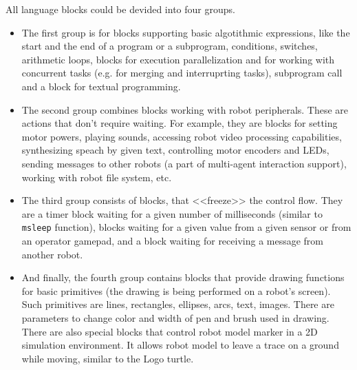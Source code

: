 \documentclass[conference]{IEEEtran}
\begin{document}
All language blocks could be devided into four groups.

\begin{itemize}
    \item The first group is for blocks supporting basic algotithmic expressions, like the start and the end of a program or a subprogram, conditions, switches, arithmetic loops, blocks for execution parallelization and for working with concurrent tasks (e.g. for merging and interruprting tasks), subprogram call and a block for textual programming.
    \item The second group combines blocks working with robot peripherals. These are actions that don't require waiting. For example, they are blocks for setting motor powers, playing sounds, accessing robot video processing capabilities, synthesizing speach by given text, controlling motor encoders and LEDs, sending messages to other robots (a part of multi-agent interaction support), working with robot file system, etc.
    \item The third group consists of blocks, that <<freeze>> the control flow. They are a timer block waiting for a given number of milliseconds (similar to \texttt{msleep} function), blocks waiting for a given value from a given sensor or from an operator gamepad, and a block waiting for receiving a message from another robot. 
    \item And finally, the fourth group contains blocks that provide drawing functions for basic primitives (the drawing is being performed on a robot's screen). Such primitives are lines, rectangles, ellipses, arcs, text, images. There are parameters to change color and width of pen and brush used in drawing. There are also special blocks that control robot model marker in a 2D simulation environment. It allows robot model to leave a trace on a ground while moving, similar to the Logo turtle.
\end{itemize}
\end{document}
